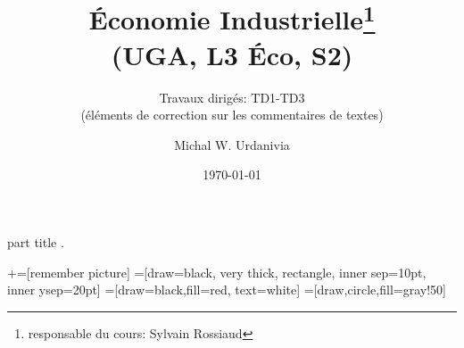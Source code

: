 
\usepackage{color}
\usepackage{tikz}
\usetikzlibrary{positioning}
\usepackage{enumerate}   
\usepackage{multirow}
%
  \usepackage{eso-pic}

{
    \begin{centering}
    \begin{beamercolorbox}[sep=11pt,center]{part title}
    \thesection.~\insertsection\par
    \end{beamercolorbox}
    \end{centering}
}
\title[]{ \textbf{Économie Industrielle}\footnote{responsable du cours: Sylvain Rossiaud} \\ (UGA, L3 Éco, S2) \\ }
\subtitle{Travaux dirigés: TD1-TD3\\ 
(éléments de correction sur les commentaires de textes)}
\date{\today}
\author{Michal W. Urdanivia\inst{*}}




\usetikzlibrary{positioning}
\usetikzlibrary{snakes}
\usetikzlibrary{calc}
\usetikzlibrary{arrows}
\usetikzlibrary{decorations.markings}
\usetikzlibrary{shapes.misc}
\usetikzlibrary{matrix,shapes,arrows,fit,tikzmark}
\usetikzlibrary{shapes}
\newcommand\marktopleft[1]{
    \tikz[overlay,remember picture] 
        \node (marker-#1-a) at (-.3em,.3em) {};%
}
\newcommand\markbottomright[2]{%
    \tikz[overlay,remember picture] 
        \node (marker-#1-b) at (0em,0em) {};%
}
+=[remember picture] 
 =[draw=black, very thick, rectangle, inner sep=10pt, inner ysep=20pt]
 =[draw=black,fill=red, text=white]
=[draw,circle,fill=gray!50]




